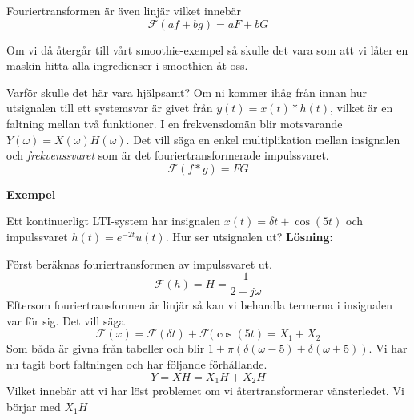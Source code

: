 \documentclass{article}
\begin{document}
Fouriertransformen är även linjär vilket innebär
\begin{displaymath}
  \mathcal{F}(a f + b g) = a F + b G
\end{displaymath}

Om vi då återgår till vårt smoothie-exempel så skulle det vara som att vi låter
en maskin hitta alla ingredienser i smoothien åt oss.

Varför skulle det här vara hjälpsamt? Om ni kommer ihåg från innan hur
utsignalen till ett systemsvar är givet från $y(t) = x(t) * h(t)$,
vilket är en faltning mellan två funktioner.
I en frekvensdomän blir motsvarande $Y(\omega) = X(\omega) H(\omega)$.
Det vill säga en enkel multiplikation mellan insignalen och
\emph{frekvenssvaret} som är det fouriertransformerade impulssvaret.
\begin{displaymath}
  \mathcal{F}(f*g) = F G
\end{displaymath}

\textbf{Exempel} %

Ett kontinuerligt LTI-system har insignalen $x(t)=\delta{t} + \cos(5 t)$
och impulssvaret $h(t) = e^{-2 t} u(t)$. Hur ser utsignalen ut?
\textbf{Lösning:}

Först beräknas fouriertransformen av impulssvaret ut.
\begin{displaymath}
  \mathcal{F}(h) = H = \frac{1}{2+j \omega}
\end{displaymath}
Eftersom fouriertransformen är linjär så kan vi behandla termerna i
insignalen var för sig. Det vill säga
\begin{displaymath}
  \mathcal{F} (x) = \mathcal{F}(\delta{t}) + \mathcal{F}(\cos(5 t) = X_1 + X_2
\end{displaymath}
Som båda är givna från tabeller och blir
$1+\pi(\delta(\omega - 5) + \delta(\omega + 5))$.
Vi har nu tagit bort faltningen och har följande förhållande.
\begin{displaymath}
  Y = X H = X_1 H + X_2 H
\end{displaymath}
Vilket innebär att vi har löst problemet om vi återtransformerar vänsterledet.
Vi börjar med $X_1 H$
\end{document}
